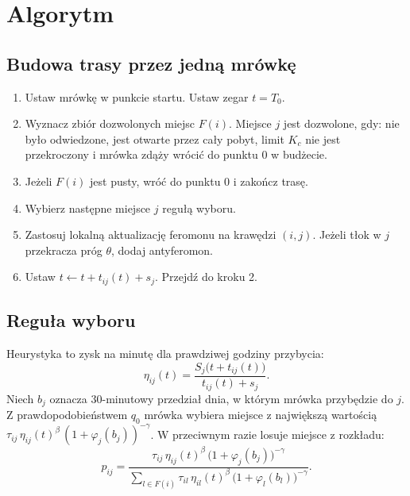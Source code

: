 \documentclass[11pt,a4paper]{article}
\begin{document}
\section{Algorytm}

\subsection{Budowa trasy przez jedną mrówkę}

\begin{enumerate}
  \item Ustaw mrówkę w punkcie startu. Ustaw zegar $t = T_0$.
  \item Wyznacz zbiór dozwolonych miejsc $F(i)$. Miejsce $j$ jest dozwolone, gdy: nie było odwiedzone, jest otwarte przez cały pobyt, limit $K_c$ nie jest przekroczony i mrówka zdąży wrócić do punktu 0 w budżecie.
  \item Jeżeli $F(i)$ jest pusty, wróć do punktu 0 i zakończ trasę.
  \item Wybierz następne miejsce $j$ regułą wyboru.
  \item Zastosuj lokalną aktualizację feromonu na krawędzi $(i, j)$. Jeżeli tłok w $j$ przekracza próg $\theta$, dodaj antyferomon.
  \item Ustaw $t \leftarrow t + t_{ij}(t) + s_j$. Przejdź do kroku 2.
\end{enumerate}

\subsection{Reguła wyboru}

Heurystyka to zysk na minutę dla prawdziwej godziny przybycia:
\begin{equation}
\eta_{ij}(t) = \frac{S_j\bigl(t + t_{ij}(t)\bigr)}{t_{ij}(t) + s_j}.
\end{equation}
Niech $b_j$ oznacza 30-minutowy przedział dnia, w którym mrówka przybędzie do $j$. Z prawdopodobieństwem $q_0$ mrówka wybiera miejsce z największą wartością $\tau_{ij}\,\eta_{ij}(t)^\beta\,(1 + \varphi_j(b_j))^{-\gamma}$. W przeciwnym razie losuje miejsce z rozkładu:
\begin{equation}
p_{ij} = \frac{\tau_{ij}\,\eta_{ij}(t)^{\beta}\,\bigl(1 + \varphi_j(b_j)\bigr)^{-\gamma}}{\sum_{l \in F(i)} \tau_{il}\,\eta_{il}(t)^{\beta}\,\bigl(1 + \varphi_l(b_l)\bigr)^{-\gamma}}.
\end{equation}
\end{document}
